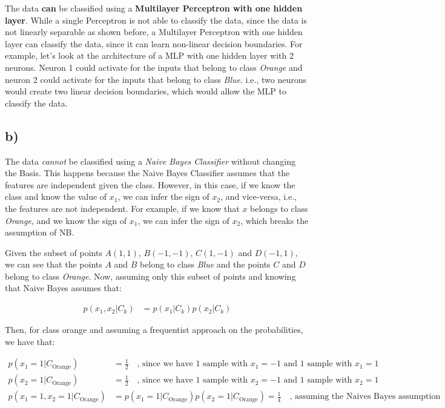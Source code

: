\documentclass[12pt,a4paper,oneside]{paper}
\begin{document}
The data \textbf{can} be classified using a \textbf{Multilayer Perceptron with one hidden layer}. 
While a single Perceptron is not able to classify the data, since the data is not linearly separable as shown before,
a Multilayer Perceptron with one hidden layer can classify the data, since it can learn non-linear decision boundaries.
For example, let's look at the architecture of a MLP with one hidden layer with 2 neurons. Neuron 1 could activate
for the inputs that belong to class \textit{Orange} and neuron 2 could activate for the inputs that belong to class \textit{Blue}. i.e., 
two neurons would create two linear decision boundaries, which would allow the MLP to classify the data. 

\newpage
\subsection*{b)}

The data \textit{cannot} be classified using a \textit{Naive Bayes Classifier} without changing the Basis. This happens because the Naive Bayes
Classifier assumes that the features are independent given the class. However, in this case, if we know the class
and know the value of $x_1$, we can infer the sign of $x_2$, and vice-versa, i.e., the features are not independent.
For example, if we know that $x$ belongs to class \textit{Orange}, and we know the sign of $x_1$, we can infer the sign of $x_2$, which breaks the assumption of NB. 

Given the subset of points $A (1, 1)$, $B (-1, -1)$, $C (1, -1)$ and $D (-1, 1)$, we can see that the points $A$ and $B$ belong to class \textit{Blue} and the points $C$ and $D$ belong to class \textit{Orange}.
Now, assuming only this subset of points and knowing that Naive Bayes assumes that: 

\begin{align*}
    p(x_1, x_2 | C_k) &= p(x_1 | C_k) p(x_2 | C_k)
\end{align*}

Then, for class orange and assuming a frequentist approach on the probabilities, we have that: 

\begin{align*}
    p(x_1 = 1 | C_{\text{Orange}}) &= \frac{1}{2} \quad \text{, since we have 1 sample with $x_1 = -1$ and 1 sample with $x_1 = 1$} \\
    p(x_2 = 1 | C_{\text{Orange}}) &= \frac{1}{2} \quad \text{, since we have 1 sample with $x_2 = -1$ and 1 sample with $x_2 = 1$} \\
    p(x_1 = 1, x_2 = 1 | C_{\text{Orange}}) &= p(x_1 = 1 | C_{\text{Orange}}) p(x_2 = 1 | C_{\text{Orange}}) = \frac{1}{4} \quad \text{, assuming the Naives Bayes assumption}
\end{align*}
\end{document}
